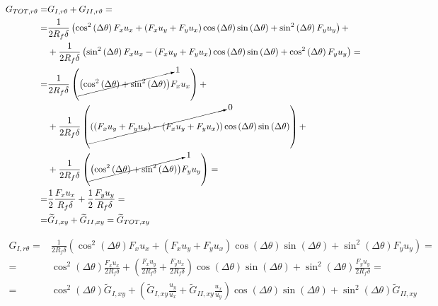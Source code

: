 \documentclass[a4paper]{jpconf}
\begin{document}
\begin{equation}
\begin{split}
G_{TOT,r\theta} = &G_{I,r\theta} + G_{II,r\theta}=\\
= &\frac{1}{2R_{f}\delta}\left(\cos^{2}\left(\Delta\theta\right) F_{x}u_{x}+\left(F_{x}u_{y}+F_{y}u_{x}\right)\cos\left(\Delta\theta\right)\sin\left(\Delta\theta\right)+\sin^{2}\left(\Delta\theta\right)F_{y}u_{y}\right)+\\
&+ \frac{1}{2R_{f}\delta}\left(\sin^{2}\left(\Delta\theta\right) F_{x}u_{x}-\left(F_{x}u_{y}+F_{y}u_{x}\right)\cos\left(\Delta\theta\right)\sin\left(\Delta\theta\right)+\cos^{2}\left(\Delta\theta\right)F_{y}u_{y}\right)=\\
=&\frac{1}{2R_{f}\delta}\left(\cancelto{1}{\left(\cos^{2}\left(\Delta\theta\right)+\sin^{2}\left(\Delta\theta\right)\right)}F_{x}u_{x}\right)+\\
&+\frac{1}{2R_{f}\delta}\left(\cancelto{0}{\left(\left(F_{x}u_{y}+F_{y}u_{x}\right)-\left(F_{x}u_{y}+F_{y}u_{x}\right)\right)}\cos\left(\Delta\theta\right)\sin\left(\Delta\theta\right)\right)+\\
&+\frac{1}{2R_{f}\delta}\left(\cancelto{1}{\left(\cos^{2}\left(\Delta\theta\right)+\sin^{2}\left(\Delta\theta\right)\right)}F_{y}u_{y}\right)=\\
=&\frac{1}{2}\frac{F_{x}u_{x}}{R_{f}\delta}+\frac{1}{2}\frac{F_{y}u_{y}}{R_{f}\delta}=\\
=&\widetilde{G}_{I,xy} + \widetilde{G}_{II,xy}=\widetilde{G}_{TOT,xy}
\end{split}
\end{equation}

\begin{equation}
\begin{split}
G_{I,r\theta} =&\frac{1}{2R_{f}\delta}\left(\cos^{2}\left(\Delta\theta\right) F_{x}u_{x}+\left(F_{x}u_{y}+F_{y}u_{x}\right)\cos\left(\Delta\theta\right)\sin\left(\Delta\theta\right)+\sin^{2}\left(\Delta\theta\right)F_{y}u_{y}\right)=\\
=&\cos^{2}\left(\Delta\theta\right)\frac{ F_{x}u_{x}}{2R_{f}\delta}+\left(\frac{F_{x}u_{y}}{2R_{f}\delta}+\frac{F_{y}u_{x}}{2R_{f}\delta}\right)\cos\left(\Delta\theta\right)\sin\left(\Delta\theta\right)+\sin^{2}\left(\Delta\theta\right)\frac{F_{y}u_{y}}{2R_{f}\delta}=\\
=&\cos^{2}\left(\Delta\theta\right)\widetilde{G}_{I,xy}+\left(\widetilde{G}_{I,xy}\frac{u_{y}}{u_{x}}+\widetilde{G}_{II,xy}\frac{u_{x}}{u_{y}}\right)\cos\left(\Delta\theta\right)\sin\left(\Delta\theta\right)+\sin^{2}\left(\Delta\theta\right)\widetilde{G}_{II,xy}
\end{split}
\end{equation}
\end{document}
